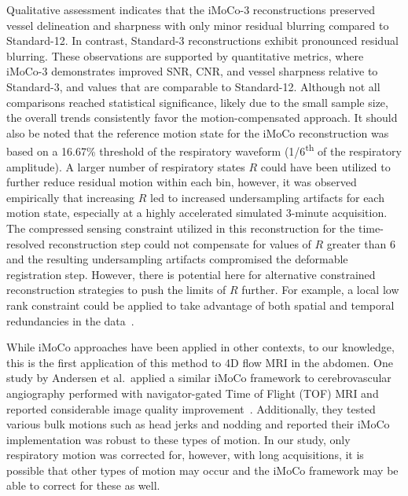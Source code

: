 Qualitative assessment indicates that the iMoCo-3 reconstructions preserved vessel delineation and sharpness with only minor residual blurring compared to Standard-12. In contrast, Standard-3 reconstructions exhibit pronounced residual blurring. These observations are supported by quantitative metrics, where iMoCo-3 demonstrates improved SNR, CNR, and vessel sharpness relative to Standard-3, and values that are comparable to Standard-12. Although not all comparisons reached statistical significance, likely due to the small sample size, the overall trends consistently favor the motion-compensated approach. It should also be noted that the reference motion state for the iMoCo reconstruction was based on a 16.67\% threshold of the respiratory waveform (1/6\textsuperscript{th} of the respiratory amplitude). A larger number of respiratory states $R$ could have been utilized to further reduce residual motion within each bin, however, it was observed empirically that increasing $R$ led to increased undersampling artifacts for each motion state, especially at a highly accelerated simulated 3-minute acquisition. The compressed sensing constraint utilized in this reconstruction for the time-resolved reconstruction step could not compensate for values of $R$ greater than 6 and the resulting undersampling artifacts compromised the deformable registration step. However, there is potential here for alternative constrained reconstruction strategies to push the limits of $R$ further. For example, a local low rank constraint could be applied to take advantage of both spatial and temporal redundancies in the data~\cite{trzaskoExploitingLocalLowrank2013,leeLLORMALocalLowrank2016}. 

While iMoCo approaches have been applied in other contexts, to our knowledge, this is the first application of this method to 4D flow MRI in the abdomen. One study by Andersen et al.\ applied a similar iMoCo framework to cerebrovascular angiography performed with navigator-gated Time of Flight (TOF) MRI and reported considerable image quality improvement~\cite{andersenImprovementDiagnosticQuality2019}. Additionally, they tested various bulk motions such as head jerks and nodding and reported their iMoCo implementation was robust to these types of motion. In our study, only respiratory motion was corrected for, however, with long acquisitions, it is possible that other types of motion may occur and the iMoCo framework may be able to correct for these as well.

